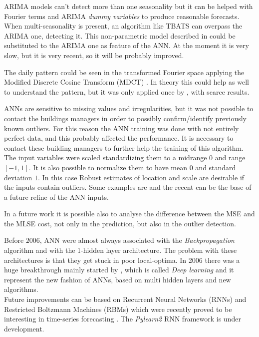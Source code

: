 \documentclass{sig-alternate-sigmod07}
\begin{document}
ARIMA models can't detect more than one seasonality but it can be helped with Fourier terms and ARIMA \emph{dummy variables} to pro­duce rea­son­able fore­casts. When multi-seasonality is present, an algorithm like TBATS can overpass the ARIMA one, detecting it. This non-parametric model described in \cite{de2011forecasting} could be substituted to the ARIMA one as feature of the ANN. At the moment it is very slow, but it is very recent, so it will be probably improved.

The daily pattern could be seen in the transformed Fourier space applying the Modified Discrete Cosine Transform (MDCT) \cite{malvar1992signal}. In theory this could help as well to understand the pattern, but it was only applied once by  \cite{busseti2012deep}, with scarce results.

ANNs are sensitive to missing values and irregularities, but it was not possible to contact the buildings managers in order to possibly confirm/identify previously known outliers. For this reason the ANN training was done with not entirely perfect data, and this probably affected the performance. It is necessary to contact these building managers to further help the training of this algorithm. \\
The input variables were scaled standardizing them to a midrange $0$ and range $[-1, 1]$. It is also possible to normalize them to have mean $0$ and standard deviation $1$. In this case Robust estimates of location and scale are desirable if the inputs contain outliers. Some examples are \cite{iglewicz1983robust} and the recent \cite{mizera2004location} can be the base of a future refine of the ANN inputs.

In a future work it is possible also to analyse the difference between the MSE and the MLSE cost, not only in the prediction, but also in the outlier detection.

Before $2006$, ANN were almost always associated with the \emph{Backpropagation} algorithm and with the 1-hidden layer architecture. The problem with these architectures is that they get stuck in poor local-optima. In 2006 there was a huge breakthrough mainly started by \cite{hinton2006fast}, which is called \emph{Deep learning} and it represent the new fashion of ANNs, based on multi hidden layers and new algorithms. \\
Future improvements can be based on Recurrent Neural Networks (RNNs) and Restricted Boltzmann Machines (RBMs) which were recently proved to be interesting in time-series forecasting \cite{busseti2012deep, taylor2009factored, sutskever2013training}. The \emph{Pylearn2} \cite{goodfellow2013pylearn2} RNN framework is under development.
\end{document}
